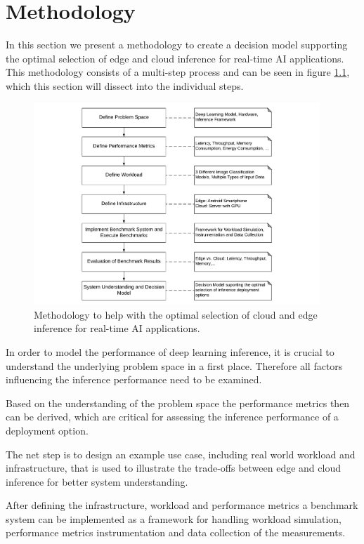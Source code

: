 \chapter{Methodology}
\label{chap:methodology}

In this section we present a methodology to create a decision model supporting the optimal selection of edge and cloud inference for real-time AI applications.
This methodology consists of a multi-step process and can be seen in figure \ref{fig:Methodology}, which this section will dissect into the individual steps.


\begin{figure}[!htb]
\centering
\includegraphics[width=0.96\textwidth]{./Bilder/Methodology.pdf}
\caption{Methodology to help with the optimal selection of cloud and edge inference for real-time AI applications.}
\label{fig:Methodology}
\end{figure}


In order to model the performance of deep learning inference, it is crucial to understand the underlying problem space in a first place.
Therefore all factors influencing the inference performance need to be examined.

Based on the understanding of the problem space the performance metrics then can be derived, which are critical for assessing the inference performance of a deployment option.

The net step is to design an example use case, including real world workload and infrastructure, that is used to illustrate the trade-offs between edge and cloud inference for better system understanding.


After defining the infrastructure, workload and performance metrics a benchmark system can be implemented as a framework for handling workload simulation, performance metrics instrumentation and data collection of the measurements.

